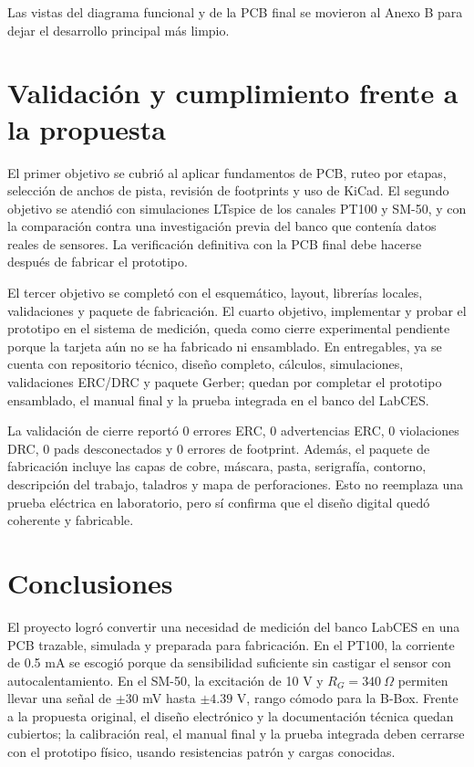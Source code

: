 \documentclass[conference]{IEEEtran}
\begin{document}
Las vistas del diagrama funcional y de la PCB final se movieron al Anexo B para dejar el desarrollo principal más limpio.

\section{Validación y cumplimiento frente a la propuesta}

El primer objetivo se cubrió al aplicar fundamentos de PCB, ruteo por etapas, selección de anchos de pista, revisión de footprints y uso de KiCad. El segundo objetivo se atendió con simulaciones LTspice de los canales PT100 y SM-50, y con la comparación contra una investigación previa del banco que contenía datos reales de sensores. La verificación definitiva con la PCB final debe hacerse después de fabricar el prototipo.

El tercer objetivo se completó con el esquemático, layout, librerías locales, validaciones y paquete de fabricación. El cuarto objetivo, implementar y probar el prototipo en el sistema de medición, queda como cierre experimental pendiente porque la tarjeta aún no se ha fabricado ni ensamblado. En entregables, ya se cuenta con repositorio técnico, diseño completo, cálculos, simulaciones, validaciones ERC/DRC y paquete Gerber; quedan por completar el prototipo ensamblado, el manual final y la prueba integrada en el banco del LabCES.

La validación de cierre reportó 0 errores ERC, 0 advertencias ERC, 0 violaciones DRC, 0 pads desconectados y 0 errores de footprint. Además, el paquete de fabricación incluye las capas de cobre, máscara, pasta, serigrafía, contorno, descripción del trabajo, taladros y mapa de perforaciones. Esto no reemplaza una prueba eléctrica en laboratorio, pero sí confirma que el diseño digital quedó coherente y fabricable.

\section{Conclusiones}

El proyecto logró convertir una necesidad de medición del banco LabCES en una PCB trazable, simulada y preparada para fabricación. En el PT100, la corriente de 0.5 mA se escogió porque da sensibilidad suficiente sin castigar el sensor con autocalentamiento. En el SM-50, la excitación de 10 V y $R_G=340~\Omega$ permiten llevar una señal de $\pm30$ mV hasta $\pm4.39$ V, rango cómodo para la B-Box. Frente a la propuesta original, el diseño electrónico y la documentación técnica quedan cubiertos; la calibración real, el manual final y la prueba integrada deben cerrarse con el prototipo físico, usando resistencias patrón y cargas conocidas.
\end{document}
